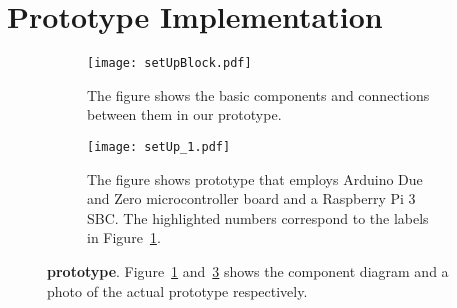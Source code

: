 \section{\name Prototype Implementation}
\label{sec:prototype}


\begin{figure}[t]
	\begin{center}
		\begin{subfigure}{0.4\textwidth}
		\centering
			\texttt{[image: setUpBlock.pdf]}
			\caption{The figure shows the basic components and connections between them in our \name prototype.}
			\label{fig:prototypeArch}	
		\end{subfigure}
	\end{center}
	
	
	\begin{center}
		\begin{subfigure}{0.4\textwidth}
		\centering
		\texttt{[image: setUp\_1.pdf]}
		\caption{The figure shows \name prototype that employs Arduino Due and Zero microcontroller board and a Raspberry Pi 3 SBC. The highlighted numbers correspond to the labels in Figure~\ref{fig:prototypeArch}.}
		\label{fig:prototype}
	\end{subfigure}
	\end{center}
	\vspace{-1em}
	\caption{\textbf{\name prototype}. Figure~\ref{fig:prototypeArch} and~\ref{fig:prototype} shows the component diagram and a photo of the actual \name prototype respectively.} 
	\spacesave
\end{figure}


\iffalse
\begin{figure}[t]
\centering
\texttt{[image: setUpBlock.pdf]}
\caption{\textbf{\name prototype architecture}. }
\label{fig:prototypeArch}
\centering
\end{figure}


\begin{figure}[t]
\centering
\texttt{[image: setUp\_1.pdf]}
\caption{\textbf{\name prototype}. The figure shows \name prototype that employs Arduino Due and Zero microcontroller board and a Raspberry Pi 3 SBC. The highlighted numbers correspond to the labels in Figure~\ref{fig:prototypeArch}.}
\spacesave
\label{fig:prototype}
\centering
\end{figure}
\fi



